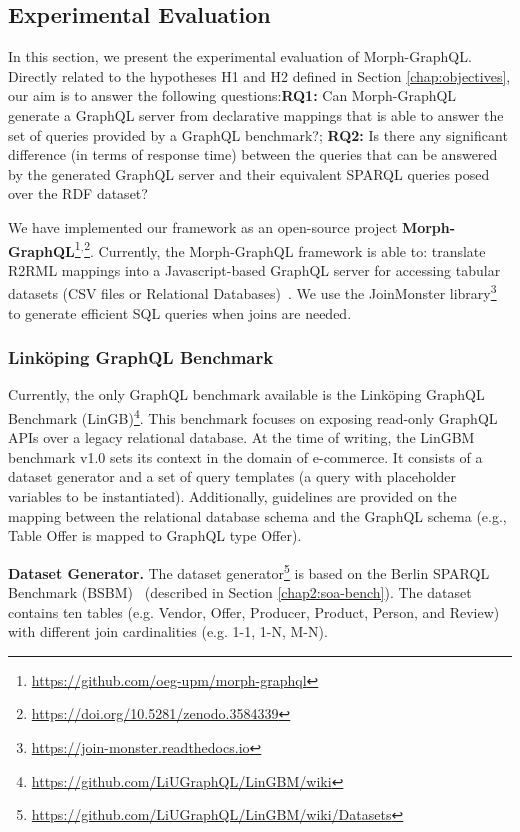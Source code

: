 


\subsection{Experimental Evaluation}
In this section, we present the experimental evaluation of Morph-GraphQL. Directly related to the hypotheses H1 and H2 defined in Section \ref{chap:objectives}, our aim is to answer the following questions:\textbf{RQ1:} Can Morph-GraphQL generate a GraphQL server from declarative mappings that is able to answer the set of queries provided by a GraphQL benchmark?; \textbf{RQ2:} Is there any significant difference (in terms of response time) between the queries that can be answered by the generated GraphQL server and their equivalent SPARQL queries posed over the RDF dataset?

We have implemented our framework as an open-source project \textbf{Morph-GraphQL}\footnote{\url{https://github.com/oeg-upm/morph-graphql}}$^,$\footnote{\url{https://doi.org/10.5281/zenodo.3584339}}. Currently, the Morph-GraphQL framework is able to: translate R2RML mappings into a Javascript-based GraphQL server for accessing tabular datasets (CSV files or Relational Databases)~\citep{priyatna2019morph}. We use the JoinMonster library\footnote{\url{https://join-monster.readthedocs.io}} to generate efficient SQL queries when joins are needed.

\subsubsection{Link\"{o}ping GraphQL Benchmark} 
Currently, the only GraphQL benchmark available is the Link\"{o}ping GraphQL Benchmark (LinGB)\footnote{\url{https://github.com/LiUGraphQL/LinGBM/wiki}}. This benchmark focuses on exposing read-only GraphQL APIs over a legacy relational database. At the time of writing, the LinGBM benchmark v1.0 sets its context in the domain of e-commerce. It consists of a dataset generator and a set of query templates (a query with placeholder variables to be instantiated). Additionally, guidelines are provided on the mapping between the relational database schema and the GraphQL schema (e.g., Table Offer is mapped to GraphQL type Offer). 

\textbf{Dataset Generator.}
The dataset generator\footnote{\url{https://github.com/LiUGraphQL/LinGBM/wiki/Datasets}} is based on the Berlin SPARQL Benchmark (BSBM)~\citep{bizer2009berlin} (described in Section \ref{chap2:soa-bench}). The dataset contains ten tables (e.g.  Vendor, Offer, Producer, Product, Person, and Review) with different join cardinalities (e.g. 1-1, 1-N, M-N).

